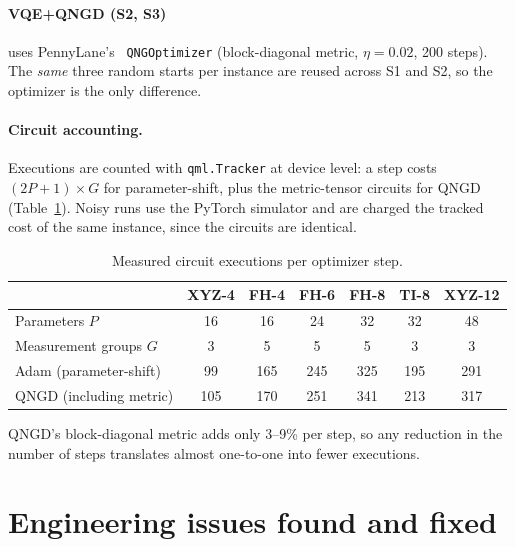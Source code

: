 \documentclass{ssnreview}
\begin{document}
\paragraph{VQE+QNGD (S2, S3)} uses PennyLane's~\cite{pennylane} \texttt{QNGOptimizer}
(block-diagonal metric, $\eta=0.02$, 200 steps). The \emph{same} three random starts per
instance are reused across S1 and S2, so the optimizer is the only difference.

\paragraph{Circuit accounting.} Executions are counted with \texttt{qml.Tracker} at device
level: a step costs $(2P+1)\times G$ for parameter-shift, plus the metric-tensor circuits for
QNGD (Table~\ref{tab:cost}). Noisy runs use the PyTorch simulator and are charged the tracked
cost of the same instance, since the circuits are identical.

\begin{table}[H]
\centering
\caption{Measured circuit executions per optimizer step.}\label{tab:cost}
\begin{tabular}{lcccccc}
\toprule
 & XYZ-4 & FH-4 & FH-6 & FH-8 & TI-8 & XYZ-12 \\
\midrule
Parameters $P$ & 16 & 16 & 24 & 32 & 32 & 48 \\
Measurement groups $G$ & 3 & 5 & 5 & 5 & 3 & 3 \\
Adam (parameter-shift) & 99 & 165 & 245 & 325 & 195 & 291 \\
QNGD (including metric) & 105 & 170 & 251 & 341 & 213 & 317 \\
\bottomrule
\end{tabular}
\end{table}

QNGD's block-diagonal metric adds only 3--9\% per step, so any reduction in the number of steps
translates almost one-to-one into fewer executions.

\section{Engineering issues found and fixed}
\end{document}
